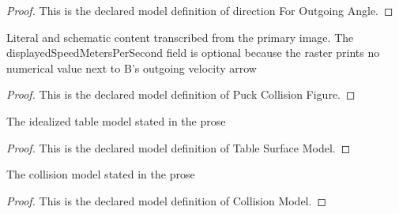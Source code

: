 \begin{proof}
  This is the declared model definition of direction For Outgoing Angle.
\end{proof}
\begin{definition}
  \label{def:physics:phyx-mini-0816:phyxminiproblems-problemphyxmini0816-puckcollisionfigure}
  Literal and schematic content transcribed from the primary image. The displayedSpeedMetersPerSecond field is optional because the raster prints no numerical value next to B's outgoing velocity arrow
\end{definition}
\begin{proof}
  This is the declared model definition of Puck Collision Figure.
\end{proof}
\begin{definition}
  \label{def:physics:phyx-mini-0816:phyxminiproblems-problemphyxmini0816-tablesurfacemodel}
  The idealized table model stated in the prose
\end{definition}
\begin{proof}
  This is the declared model definition of Table Surface Model.
\end{proof}
\begin{definition}
  \label{def:physics:phyx-mini-0816:phyxminiproblems-problemphyxmini0816-collisionmodel}
  The collision model stated in the prose
\end{definition}
\begin{proof}
  This is the declared model definition of Collision Model.
\end{proof}
